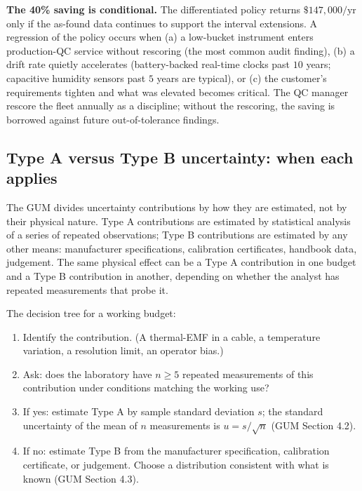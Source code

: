 \textbf{The 40\% saving is conditional.} The differentiated policy
returns $\$147{,}000/\text{yr}$ only if the as-found data
continues to support the interval extensions. A regression of
the policy occurs when (a) a low-bucket instrument enters
production-QC service without rescoring (the most common audit
finding), (b) a drift rate quietly accelerates (battery-backed
real-time clocks past $10$ years; capacitive humidity sensors
past $5$ years are typical), or (c) the customer's requirements
tighten and what was elevated becomes critical. The QC manager
rescore the fleet annually as a discipline; without the
rescoring, the saving is borrowed against future
out-of-tolerance findings.

\subsection{Type A versus Type B uncertainty: when each applies}

The GUM \cite{std:ch03t3-jcgm-100-2008} divides uncertainty
contributions by how they are estimated, not by their physical
nature. Type A contributions are estimated by statistical analysis
of a series of repeated observations; Type B contributions are
estimated by any other means: manufacturer specifications,
calibration certificates, handbook data, judgement. The same
physical effect can be a Type A contribution in one budget and a
Type B contribution in another, depending on whether the analyst
has repeated measurements that probe it.

The decision tree for a working budget:

\begin{enumerate}[leftmargin=*]
  \item Identify the contribution. (A thermal-EMF in a cable, a
    temperature variation, a resolution limit, an operator bias.)
  \item Ask: does the laboratory have $n \geq 5$ repeated
    measurements of this contribution under conditions matching
    the working use?
  \item If yes: estimate Type A by sample standard deviation
    $s$; the standard uncertainty of the mean of $n$ measurements
    is $u = s/\sqrt{n}$ (GUM Section 4.2).
  \item If no: estimate Type B from the manufacturer specification,
    calibration certificate, or judgement. Choose a distribution
    consistent with what is known (GUM Section 4.3).
\end{enumerate}

